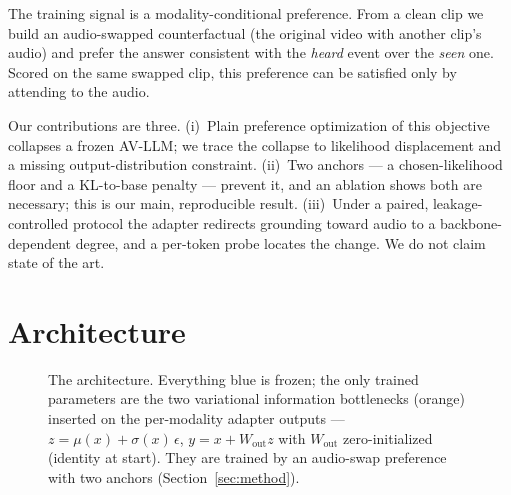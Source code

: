 \documentclass{article}
\begin{document}
The training signal is a modality-conditional preference. From a clean clip we build an audio-swapped
counterfactual (the original video with another clip's audio) and prefer the answer consistent with the
\emph{heard} event over the \emph{seen} one. Scored on the same swapped clip, this preference can be
satisfied only by attending to the audio.

Our contributions are three. (i)~Plain preference optimization of this objective collapses a frozen
AV-LLM; we trace the collapse to likelihood displacement and a missing output-distribution constraint.
(ii)~Two anchors --- a chosen-likelihood floor and a KL-to-base penalty --- prevent it, and an ablation
shows both are necessary; this is our main, reproducible result. (iii)~Under a paired, leakage-controlled
protocol the adapter redirects grounding toward audio to a backbone-dependent degree, and a per-token
probe locates the change. We do not claim state of the art.

\section{Architecture}
\label{sec:arch}

\begin{figure}[tb]
\centering
{}
\caption{The architecture. Everything blue is frozen; the only trained parameters are the two variational
information bottlenecks (orange) inserted on the per-modality adapter outputs ---
$z=\mu(x)+\sigma(x)\,\epsilon$, $y=x+W_{\text{out}}z$ with $W_{\text{out}}$ zero-initialized (identity at
start). They are trained by an audio-swap preference with two anchors (Section~\ref{sec:method}).}
\label{fig:method}
\end{figure}
\end{document}
